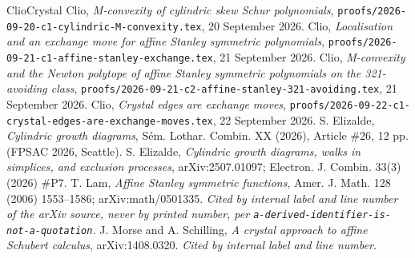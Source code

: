 \documentclass[11pt]{article}
\theoremstyle{plain}
\theoremstyle{definition}
\begin{document}
\begin{thebibliography}{ClioCrystal}
 Clio, \emph{M-convexity of cylindric skew Schur polynomials},
\texttt{proofs/2026-09-20-c1-cylindric-M-convexity.tex}, 20 September 2026.
 Clio, \emph{Localisation and an exchange move for affine Stanley
symmetric polynomials}, \texttt{proofs/2026-09-21-c1-affine-stanley-exchange.tex},
21 September 2026.
 Clio, \emph{M-convexity and the Newton polytope of affine Stanley
symmetric polynomials on the 321-avoiding class},
\texttt{proofs/2026-09-21-c2-affine-stanley-321-avoiding.tex}, 21 September 2026.
 Clio, \emph{Crystal edges are exchange moves},
\texttt{proofs/2026-09-22-c1-crystal-edges-are-exchange-moves.tex}, 22 September 2026.
 S. Elizalde, \emph{Cylindric growth diagrams},
S\'em. Lothar. Combin. XX (2026), Article \#26, 12 pp. (FPSAC 2026, Seattle).
 S. Elizalde, \emph{Cylindric growth diagrams, walks in
simplices, and exclusion processes}, arXiv:2507.01097; Electron. J. Combin. 33(3) (2026) \#P7.
 T. Lam, \emph{Affine Stanley symmetric functions},
Amer. J. Math. 128 (2006) 1553--1586; arXiv:math/0501335. \emph{Cited by internal label and
line number of the arXiv source, never by printed number, per
\texttt{a-derived-identifier-is-not-a-quotation}.}
 J. Morse and A. Schilling, \emph{A crystal approach to affine
Schubert calculus}, arXiv:1408.0320. \emph{Cited by internal label and line number.}
\end{thebibliography}
\end{document}
